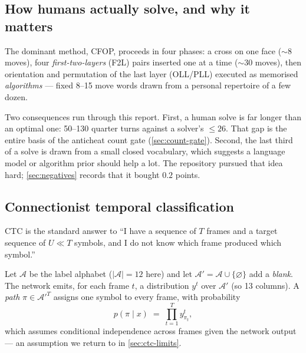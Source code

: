 \subsection{How humans actually solve, and why it matters}

The dominant method, CFOP, proceeds in four phases: a cross on one face
($\sim$8 moves), four \emph{first-two-layers} (F2L) pairs inserted one at a
time ($\sim$30 moves), then orientation and permutation of the last layer
(OLL/PLL) executed as memorised \emph{algorithms} --- fixed 8--15 move words
drawn from a personal repertoire of a few dozen.

Two consequences run through this report. First, a human solve is far longer
than an optimal one: 50--130 quarter turns against a solver's $\le 26$. That
gap is the entire basis of the anticheat count gate (\cref{sec:count-gate}).
Second, the last third of a solve is drawn from a small closed vocabulary,
which suggests a language model or algorithm prior should help a lot. The
repository pursued that idea hard; \cref{sec:negatives} records that it
bought $0.2$ points.

\subsection{Connectionist temporal classification}
\label{sec:ctc-bg}

CTC \cite{graves2006} is the standard answer to ``I have a sequence of
$T$ frames and a target sequence of $U \ll T$ symbols, and I do not know
which frame produced which symbol.''

Let $\mathcal{A}$ be the label alphabet ($|\mathcal{A}| = 12$ here) and let
$\mathcal{A}' = \mathcal{A}\cup\{\varnothing\}$ add a \emph{blank}. The
network emits, for each frame $t$, a distribution $y^t$ over $\mathcal{A}'$
(so 13 columns). A \emph{path} $\pi \in \mathcal{A}'^T$ assigns one symbol
to every frame, with probability
\begin{equation}
p(\pi \mid x) \;=\; \prod_{t=1}^{T} y^t_{\pi_t},
\label{eq:pathprob}
\end{equation}
which assumes conditional independence across frames given the network
output --- an assumption we return to in \cref{sec:ctc-limits}.

